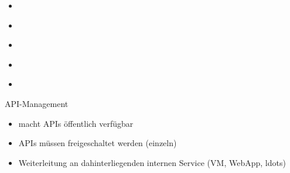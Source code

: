 \begin{flashcard}[]{}
  \begin{itemize}
    \item
  \end{itemize}
\end{flashcard}

\begin{flashcard}[]{}
  \begin{itemize}
    \item
  \end{itemize}
\end{flashcard}

\begin{flashcard}[]{}
  \begin{itemize}
    \item
  \end{itemize}
\end{flashcard}

\begin{flashcard}[]{}
  \begin{itemize}
    \item
  \end{itemize}
\end{flashcard}



\begin{flashcard}[]{}
  \begin{itemize}
    \item
  \end{itemize}
\end{flashcard}

\begin{flashcard}[]{API-Management}
  \begin{itemize}
    \item macht APIs öffentlich verfügbar
    \item APIs müssen freigeschaltet werden (einzeln)
    \item Weiterleitung an dahinterliegenden internen Service (VM, WebApp, ldots)
  \end{itemize}
\end{flashcard}

